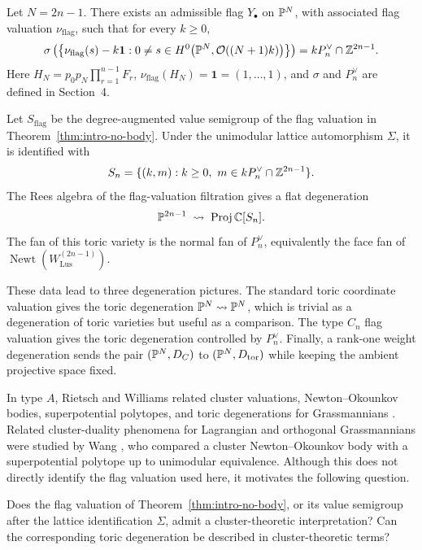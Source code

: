 \begin{thm}\label{thm:intro-no-body}
Let \(N=2n-1\). There exists an admissible flag \(Y_\bullet\) on \(\mathbb{P}^N\), with associated flag valuation \(\nu_{\mathrm{flag}}\), such that for every \(k\ge0\),
\[
\sigma\left(
\left\{
\nu_{\mathrm{flag}}(s)-k\mathbf 1:
0\ne s\in H^0\bigl(\mathbb{P}^N,\mathcal O((N+1)k)\bigr)
\right\}
\right)
=
kP_n^\vee\cap\mathbb{Z}^{2n-1}.
\]
Here \(H_N=p_0p_N\prod_{r=1}^{n-1}F_r\), \(\nu_{\mathrm{flag}}(H_N)=\mathbf 1=(1,\ldots,1)\), and \(\sigma\) and \(P_n^\vee\) are defined in Section~4.
\end{thm}

\begin{cor}\label{cor:intro-toric-degen}
Let \(S_{\mathrm{flag}}\) be the degree-augmented value semigroup of the flag valuation in Theorem~\ref{thm:intro-no-body}. Under the unimodular lattice automorphism \(\Sigma\), it is identified with
\[
S_n=\{(k,m):k\ge0,\ m\in kP_n^\vee\cap\ZZ^{2n-1}\}.
\]
The Rees algebra of the flag-valuation filtration gives a flat degeneration
\[
\mathbb{P}^{2n-1}\;\rightsquigarrow\; \operatorname{Proj}\mathbb{C}[S_n].
\]
The fan of this toric variety is the normal fan of \(P_n^\vee\), equivalently the face fan of \(\operatorname{Newt}(W_{\mathrm{Lus}}^{(2n-1)})\).
\end{cor}

These data lead to three degeneration pictures. The standard toric coordinate valuation gives the toric degeneration \(\mathbb{P}^N\rightsquigarrow \mathbb{P}^N\), which is trivial as a degeneration of toric varieties but useful as a comparison. The type \(C_n\) flag valuation gives the toric degeneration controlled by \(P_n^\vee\). Finally, a rank-one weight degeneration sends the pair \((\mathbb{P}^N,D_C)\) to \((\mathbb{P}^N,D_{\mathrm{tor}})\) while keeping the ambient projective space fixed.

In type \(A\), Rietsch and Williams related cluster valuations, Newton--Okounkov bodies, superpotential polytopes, and toric degenerations for Grassmannians \cite{RW}. Related cluster-duality phenomena for Lagrangian and orthogonal Grassmannians were studied by Wang \cite{clusterC}, who compared a cluster Newton--Okounkov body with a superpotential polytope up to unimodular equivalence. Although this does not directly identify the flag valuation used here, it motivates the following question.

\begin{ques}
Does the flag valuation of Theorem~\ref{thm:intro-no-body}, or its value semigroup after the lattice identification \(\Sigma\), admit a cluster-theoretic interpretation? Can the corresponding toric degeneration be described in cluster-theoretic terms?
\end{ques}

